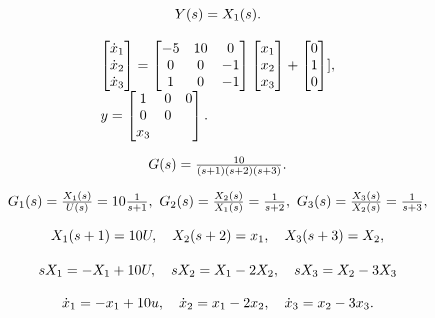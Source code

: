 \documentclass{article}
\begin{document}
\[
$$
Y ( s )=X_{1} ( s ).
$$
\]

\[
$$
\begin{array} {l} {{\left[ \begin{matrix} {{\dot{x}}_{1}} \\ {{\dot{x}}_{2}} \\ {{\dot{x}}_{3}} \\ \end{matrix} \right]=\left[ \begin{matrix} {-5} & {1 0} & {0} \\ {0} & {0} & {-1} \\ {1} & {0} & {-1} \\ \end{matrix} \right] \left[ \begin{matrix} {x_{1}} \\ {x_{2}} \\ {x_{3}} \\ \end{matrix} \right]+\left[ \begin{matrix} {0} \\ {1} \\ {0} \\ \end{matrix} \right] ],}} \\ {{y=\left[ \begin{matrix} {1} & {0} & {0} \\ {0} & {0} \\ {x_{3}} \\ \end{matrix} \right].}} \end{array}
$$
\]

\[
$$
G ( s )={\frac{1 0} {( s+1 ) ( s+2 ) ( s+3 )}}.
$$
\]

\[
$$
G_{1} ( s )={\frac{X_{1} ( s )} {U ( s )}}=1 0 {\frac{1} {s+1}}, \ G_{2} ( s )={\frac{X_{2} ( s )} {X_{1} ( s )}}={\frac{1} {s+2}}, \ G_{3} ( s )={\frac{X_{3} ( s )} {X_{2} ( s )}}={\frac{1} {s+3}},
$$
\]

\[
$$
X_{1} ( s+1 )=1 0 U, \quad X_{2} ( s+2 )=x_{1}, \quad X_{3} ( s+3 )=X_{2},
$$
\]

\[
$$
s X_{1}=-X_{1}+1 0 U, \quad s X_{2}=X_{1}-2 X_{2}, \quad s X_{3}=X_{2}-3 X_{3}
$$
\]

\[
$$
\dot{x}_{1}=-x_{1}+1 0 u, \quad\dot{x}_{2}=x_{1}-2 x_{2}, \quad\dot{x}_{3}=x_{2}-3 x_{3}.
$$
\]
\end{document}
